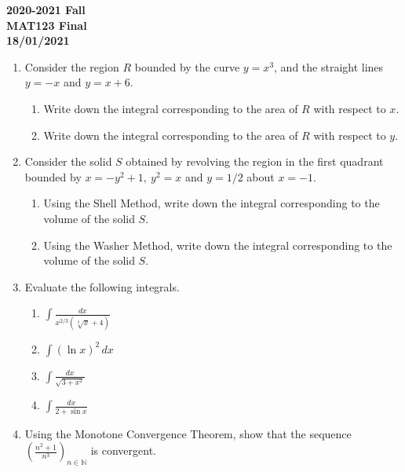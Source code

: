 \documentclass[a4paper, 12pt]{article}
\begin{document}
\newpage
{}
{}

\begin{center}
\textbf{2020-2021 Fall\\MAT123 Final\\18/01/2021}
\end{center}

\begin{enumerate}[leftmargin=*,label=\textbf{\arabic*.}]
\item Consider the region $R$ bounded by the curve $y=x^3$, and the straight lines $y=-x$ and $y=x+6$.

\begin{enumerate}[leftmargin=*,label=\textbf{\roman*.}]
\item Write down the integral corresponding to the area of $R$ with respect to $x$.
\item Write down the integral corresponding to the area of $R$ with respect to $y$.
\end{enumerate}

\item Consider the solid $S$ obtained by revolving the region in the first quadrant bounded by $x=-y^2+1,\:y^2=x$ and $y=1/2$ about $x=-1$.

\begin{enumerate}[leftmargin=*,label=\textbf{\roman*.}]
\item Using the Shell Method, write down the integral corresponding to the volume of the solid $S$.

\item Using the Washer Method, write down the integral corresponding to the volume of the solid $S$.
\end{enumerate}

\item Evaluate the following integrals.

\begin{enumerate}[leftmargin=*,label=\textbf{\alph*.}]
\item $\displaystyle\int\frac{dx}{x^{2/3}\left(\sqrt[3]{x}+4\right)}$
\item $\displaystyle\int(\ln x)^2\,dx$
\item $\displaystyle\int\frac{dx}{\sqrt{3+x^2}}$
\item $\displaystyle\int\frac{dx}{2+\sin x}$
\end{enumerate}

\item Using the Monotone Convergence Theorem, show that the sequence  $\displaystyle\left(\frac{n^2+1}{n^3}\right)_{n\in\mathbb{N}}$ is convergent.


\end{enumerate}
\end{document}
